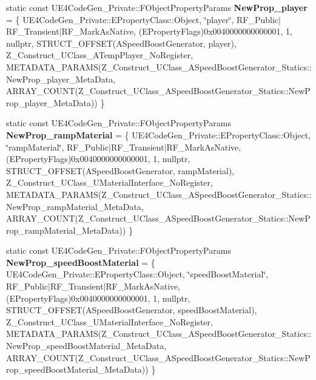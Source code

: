 \begin{DoxyCompactItemize}
static const U\+E4\+Code\+Gen\+\_\+\+Private\+::\+F\+Object\+Property\+Params {\bfseries New\+Prop\+\_\+player} = \{ U\+E4\+Code\+Gen\+\_\+\+Private\+::\+E\+Property\+Class\+::\+Object, \char`\"{}player\char`\"{}, R\+F\+\_\+\+Public$\vert$R\+F\+\_\+\+Transient$\vert$R\+F\+\_\+\+Mark\+As\+Native, (E\+Property\+Flags)0x0040000000000001, 1, nullptr, S\+T\+R\+U\+C\+T\+\_\+\+O\+F\+F\+S\+E\+T(\+A\+Speed\+Boost\+Generator, player), Z\+\_\+\+Construct\+\_\+\+U\+Class\+\_\+\+A\+Temp\+Player\+\_\+\+No\+Register, M\+E\+T\+A\+D\+A\+T\+A\+\_\+\+P\+A\+R\+A\+M\+S(\+Z\+\_\+\+Construct\+\_\+\+U\+Class\+\_\+\+A\+Speed\+Boost\+Generator\+\_\+\+Statics\+::\+New\+Prop\+\_\+player\+\_\+\+Meta\+Data, A\+R\+R\+A\+Y\+\_\+\+C\+O\+U\+N\+T(\+Z\+\_\+\+Construct\+\_\+\+U\+Class\+\_\+\+A\+Speed\+Boost\+Generator\+\_\+\+Statics\+::\+New\+Prop\+\_\+player\+\_\+\+Meta\+Data)) \}
\item 
\mbox{\label{struct_z___construct___u_class___a_speed_boost_generator___statics_abe9ee77441d33a1167bfb855c5f55eb6}} 
static const U\+E4\+Code\+Gen\+\_\+\+Private\+::\+F\+Object\+Property\+Params {\bfseries New\+Prop\+\_\+ramp\+Material} = \{ U\+E4\+Code\+Gen\+\_\+\+Private\+::\+E\+Property\+Class\+::\+Object, \char`\"{}ramp\+Material\char`\"{}, R\+F\+\_\+\+Public$\vert$R\+F\+\_\+\+Transient$\vert$R\+F\+\_\+\+Mark\+As\+Native, (E\+Property\+Flags)0x0040000000000001, 1, nullptr, S\+T\+R\+U\+C\+T\+\_\+\+O\+F\+F\+S\+E\+T(\+A\+Speed\+Boost\+Generator, ramp\+Material), Z\+\_\+\+Construct\+\_\+\+U\+Class\+\_\+\+U\+Material\+Interface\+\_\+\+No\+Register, M\+E\+T\+A\+D\+A\+T\+A\+\_\+\+P\+A\+R\+A\+M\+S(\+Z\+\_\+\+Construct\+\_\+\+U\+Class\+\_\+\+A\+Speed\+Boost\+Generator\+\_\+\+Statics\+::\+New\+Prop\+\_\+ramp\+Material\+\_\+\+Meta\+Data, A\+R\+R\+A\+Y\+\_\+\+C\+O\+U\+N\+T(\+Z\+\_\+\+Construct\+\_\+\+U\+Class\+\_\+\+A\+Speed\+Boost\+Generator\+\_\+\+Statics\+::\+New\+Prop\+\_\+ramp\+Material\+\_\+\+Meta\+Data)) \}
\item 
\mbox{\label{struct_z___construct___u_class___a_speed_boost_generator___statics_a15a6c19c3bbef6281050894cfa823ed1}} 
static const U\+E4\+Code\+Gen\+\_\+\+Private\+::\+F\+Object\+Property\+Params {\bfseries New\+Prop\+\_\+speed\+Boost\+Material} = \{ U\+E4\+Code\+Gen\+\_\+\+Private\+::\+E\+Property\+Class\+::\+Object, \char`\"{}speed\+Boost\+Material\char`\"{}, R\+F\+\_\+\+Public$\vert$R\+F\+\_\+\+Transient$\vert$R\+F\+\_\+\+Mark\+As\+Native, (E\+Property\+Flags)0x0040000000000001, 1, nullptr, S\+T\+R\+U\+C\+T\+\_\+\+O\+F\+F\+S\+E\+T(\+A\+Speed\+Boost\+Generator, speed\+Boost\+Material), Z\+\_\+\+Construct\+\_\+\+U\+Class\+\_\+\+U\+Material\+Interface\+\_\+\+No\+Register, M\+E\+T\+A\+D\+A\+T\+A\+\_\+\+P\+A\+R\+A\+M\+S(\+Z\+\_\+\+Construct\+\_\+\+U\+Class\+\_\+\+A\+Speed\+Boost\+Generator\+\_\+\+Statics\+::\+New\+Prop\+\_\+speed\+Boost\+Material\+\_\+\+Meta\+Data, A\+R\+R\+A\+Y\+\_\+\+C\+O\+U\+N\+T(\+Z\+\_\+\+Construct\+\_\+\+U\+Class\+\_\+\+A\+Speed\+Boost\+Generator\+\_\+\+Statics\+::\+New\+Prop\+\_\+speed\+Boost\+Material\+\_\+\+Meta\+Data)) \}

\end{DoxyCompactItemize}
